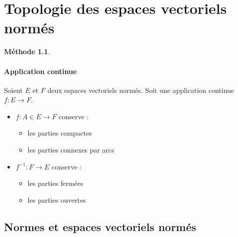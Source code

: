 \documentclass[11pt,a4paper]{report}
\theoremstyle{definition}
\newtheorem{methode}[theorem]{Méthode}
\begin{document}
\chapter{Topologie des espaces vectoriels normés}
\begin{methode}
     \subsubsection*{Application continue}
     Soient $E$ et $F$ deux espaces vectoriels normés. Soit une application continue $f : E \to F$.
     \begin{itemize}
         \item $f : A\in E\to F$ conserve : 
         \begin{itemize}
            \item les parties compactes
            \item les parties connexes par arcs
         \end{itemize}
         \item $f^{-1} : F \to E$ conserve :
         \begin{itemize}
             \item les parties fermées
             \item les parties ouvertes
         \end{itemize}
     \end{itemize}
\end{methode}
\section{Normes et espaces vectoriels normés}
\end{document}
